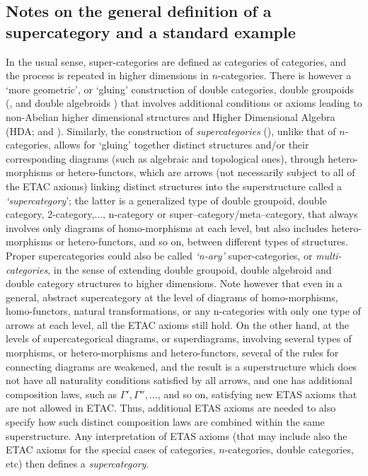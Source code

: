 \documentclass[12pt]{article}
\theoremstyle{plain}
\theoremstyle{definition}
\numberwithin{equation}{section}
\begin{document}
\subsection{Notes on the general definition of a supercategory and a standard example} 
In the usual sense, super-categories are defined as categories of categories,
and the process is repeated in higher dimensions in $n$-categories. There is however
a `more geometric', or `gluing' construction of double categories, double groupoids (\cite{BS}, and 
double algebroids \cite{BM}) that involves additional conditions or axioms leading to non-Abelian higher dimensional structures and Higher Dimensional Algebra (HDA;\cite{BS, BM} and \cite{BGB2}). Similarly, the construction of \textit{supercategories} (\cite{ICB3}), unlike that of $n$-categories, allows for `gluing' together distinct structures
and/or their corresponding diagrams (such as algebraic and topological ones), through hetero-morphisms or hetero-functors, which are arrows (not necessarily subject to all of the ETAC axioms) linking distinct structures into the superstructure called a \textit{`supercategory}'; the latter is a generalized type of double groupoid, double category, 2-category,..., n-category or super--category/meta--category, that always involves only diagrams of homo-morphisms at each level, but also includes hetero-morphisms or hetero-functors, and so on, between different types of structures. 
Proper supercategories could also be called \textit{`n-ary'} super-categories, or \textit{multi-categories}, in the sense of extending double groupoid, double algebroid and double category structures to higher dimensions. 
Note however that even in a general, abstract supercategory at the level of diagrams of homo-morphisms, homo-functors, natural transformations, or any n-categories with only one type of arrows at each level, all the ETAC axioms still hold. On the other hand, at the levels of supercategorical diagrams, or superdiagrams, involving several types of morphisms, or hetero-morphisms and hetero-functors, several of the rules for connecting diagrams are weakened, and the result is a superstructure which does not have all naturality conditions satisfied by all arrows, and one has additional composition laws, such as $\Gamma', \Gamma'', ...$, and so on,  satisfying new ETAS axioms that are not allowed in ETAC. Thus, additional ETAS axioms are needed to also specify how such distinct composition laws are combined within the same superstructure. Any interpretation of ETAS axioms (that may include also the ETAC axioms for the special cases of categories, $n$-categories, double categories, etc) then defines a \textit{supercategory}.
\end{document}
